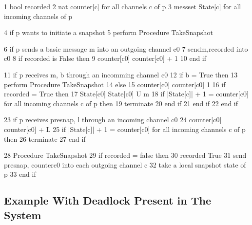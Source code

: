 \documentclass[letterpaper,10pt,english]{sphinxmanual}
\begin{document}
\begin{sphinxVerbatim}[commandchars=\\\{\},numbers=left,firstnumber=1,stepnumber=1]
1   bool recorded
2   nat counter[c] for all channels c of p
3   mess\PYGZhy{}set State[c] for all incoming channels of p

4   if p wants to initiate a snapshot
5   perform Procedure TakeSnapshot

6   if p sends a basic message m into an outgoing channel c\PYGZlt{}0\PYGZgt{}
7   send\PYGZlt{}m,recorded\PYGZgt{} into c\PYGZlt{}0\PYGZgt{}
8   if recorded is False then
9       counter[c\PYGZlt{}0\PYGZgt{}] \PYGZlt{}\PYGZhy{} counter[c\PYGZlt{}0\PYGZgt{}] + 1
10  end if

11  if p receives \PYGZlt{}m, b\PYGZgt{} through an incomming channel c\PYGZlt{}0\PYGZgt{}
12  if b = True then
13      perform Procedure TakeSnapshot
14  else
15      counter[c\PYGZlt{}0\PYGZgt{}] \PYGZlt{}\PYGZhy{} counter[c\PYGZlt{}0\PYGZgt{}] \PYGZhy{} 1
16      if recorded = True then
17          State[c\PYGZlt{}0\PYGZgt{}] \PYGZlt{}\PYGZhy{} State[c\PYGZlt{}0\PYGZgt{}] U \PYGZob{}m\PYGZcb{}
18          if |State[c]| + 1 = counter[c\PYGZlt{}0\PYGZgt{}] for all incoming channels c of p then
19              terminate
20          end if
21      end if
22  end if

23  if p receives \PYGZlt{}presnap, l\PYGZgt{} through an incoming channel c\PYGZlt{}0\PYGZgt{}
24  counter[c\PYGZlt{}0\PYGZgt{}] \PYGZlt{}\PYGZhy{} counter[c\PYGZlt{}0\PYGZgt{}] + L
25  if |State[c]| + 1 = counter[c\PYGZlt{}0\PYGZgt{}] for all incoming channels c of p then
26      terminate
27  end if

28  Procedure TakeSnapshot
29  if recorded = false then
30      recorded \PYGZlt{}\PYGZhy{} True
31  send \PYGZlt{}presnap, counter\PYGZlt{}c0\PYGZgt{}\PYGZgt{} into each outgoing channel c
32  take a local snapshot state of p
33  end if
\end{sphinxVerbatim}


\subsection{Example With Deadlock Present in The System}
\label{\detokenize{docs/BrachaToueg/algorithm:example-with-deadlock-present-in-the-system}}
\end{document}
